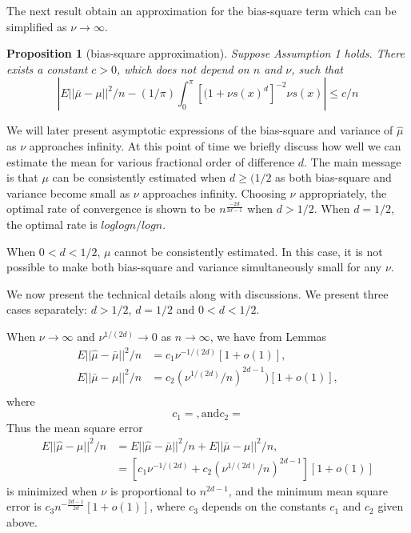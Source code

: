 \documentclass[11pt]{article}
\newtheorem{proposition}[theorem]{Proposition}
\numberwithin{equation}{section}
\numberwithin{figure}{section}
\begin{document}
The next result obtain an approximation for the bias-square term which can be simplified as $\nu\rightarrow {\infty}$.

\begin{proposition}[bias-square approximation]
Suppose Assumption 1 holds. There exists a constant $c>0$, which does not depend on $n$ and $\nu$, such that
\begin{equation*}
\left| E||\bar{\mu}-\mu||^2/n-(1/{\pi})\int_{0}^{\pi}[(1+\nu s(x)^d]^{-2} \nu s(x) \right| \leq{c/n}
\end{equation*}
\end{proposition}

We will later present asymptotic expressions of the bias-square and variance of $\widehat{\mu}$ as $\nu$ approaches infinity. At this point of time we briefly discuss how well we can estimate the mean for various fractional order of difference $d$. The main message is that $\mu$ can be consistently estimated when $d\geq(1/2$ as both bias-square and variance become small as $\nu$ approaches infinity. Choosing $\nu$ appropriately, the optimal rate of convergence is shown to be $n^\frac{-2d}{2d-1}$ when $d>1/2$. When $d=1/2$, the optimal rate is $loglogn/logn$. 

When $0<d<1/2$, $\mu$ cannot be consistently estimated. In this case, it is not possible to make both bias-square and variance simultaneously small for any $\nu$.

We now present the technical details along with discussions. We present three cases separately: $d>1/2$, $d=1/2$ and $0<d<1/2$. 


When $\nu \rightarrow \infty$ and $\nu^{1/(2d)} \rightarrow 0$ as $n \rightarrow \infty$, we have from Lemmas 
\begin{align*}
     E||\widehat{\mu}-\bar{\mu}||^2/n & =c_{1}\nu^{-1/(2d)}[1+o(1)],\\
     E||\bar{\mu}-\mu||^2/n &=c_{2}(\nu^{1/(2d)}/n)^{2d-1})[1+o(1)], \\
\end{align*}
where
\begin{equation*}
c_{1}=, \text{and} c_{2}=
\end{equation*}
Thus the mean square error
\begin{align*}
    E||\widehat{\mu}-\mu||^2/n &=E||\widehat{\mu}-\bar{\mu}||^2/n+E||\bar{\mu}-\mu||^2/n, \\
    &=[c_{1}\nu^{-1/(2d)}+c_{2}(\nu^{1/(2d)}/n)^{2d-1}][1+o(1)]   
\end{align*}
is minimized when $\nu$ is proportional to $n^{2d-1}$, and the minimum mean square error is $c_{3}n^{-\frac{2d-1}{2d}}[1+o(1)]$, where $c_3$ depends on the constants $c_1$ and $c_2$ given above. 
\end{document}
